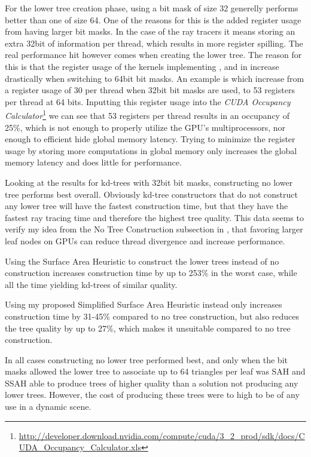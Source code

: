 For the lower tree creation phase, using a bit mask of size 32 generelly
performs better than one of size 64. One of the reasons for this is the added
register usage from having larger bit masks. In the case of the ray tracers it
means storing an extra 32bit of information per thread, which results in more
register spilling. The real performance hit however comes when creating the
lower tree. The reason for this is that the register usage of the kernels
implementing ,  and
 in  increase
drastically when switching to 64bit bit masks. An example is
 which increase from a register usage of 30 per
thread when 32bit bit masks are used, to 53 registers per thread at 64
bits. Inputting this register usage into the \textit{CUDA Occupancy
  Calculator}\footnote{\url{http://developer.download.nvidia.com/compute/cuda/3_2_prod/sdk/docs/CUDA_Occupancy_Calculator.xls}}
we can see that 53 registers per thread results in an occupancy of 25\%, which
is not enough to properly utilize the GPU's multiprocessors, nor enough to
efficient hide global memory latency. Trying to minimize the register usage by
storing more computations in global memory only increases the global memory
latency and does little for performance.

Looking at the results for kd-trees with 32bit bit masks, constructing no lower
tree performs best overall. Obviously kd-tree constructors that do not construct
any lower tree will have the fastest construction time, but that they have the
fastest ray tracing time and therefore the highest tree quality. This data seems
to verify my idea from the No Tree Construction subsection in
, that favoring larger leaf nodes on GPUs can reduce
thread divergence and increase performance.

Using the Surface Area Heuristic to construct the lower trees instead of no
construction increases construction time by up to 253\% in the worst case, while
all the time yielding kd-trees of similar quality.

Using my proposed Simplified Surface Area Heuristic instead only increases
construction time by 31-45\% compared to no tree construction, but also reduces
the tree quality by up to 27\%, which makes it unsuitable compared to no tree
construction.

In all cases constructing no lower tree performed best, and only when the bit
masks allowed the lower tree to associate up to 64 triangles per leaf was SAH
and SSAH able to produce trees of higher quality than a solution not producing
any lower trees. However, the cost of producing these trees were to high to be
of any use in a dynamic scene.
